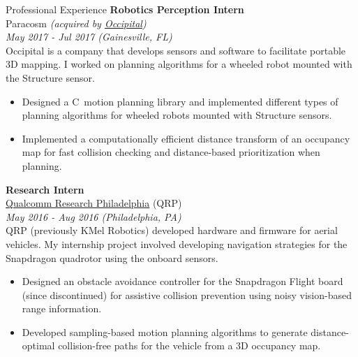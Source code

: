 \documentclass[9pt]{article}
\newcommand \CPP {{C\nolinebreak[4]\hspace{-.05em}\raisebox{.4ex}{\tiny\bf ++}}}
\begin{document}
\begin{rsection}{Professional Experience}
    \textbf{Robotics Perception Intern} \\
    Paracosm \textit{(acquired by \href{https://occipital.com/}{Occipital})}\\
    \textit{May 2017 - Jul 2017 (Gainesville, FL)} 
    \vspace{0.5em} \\
    Occipital is a company that develops sensors and software to facilitate portable 3D mapping. I worked on planning algorithms for a wheeled robot mounted with the Structure sensor.
    \begin{itemize}
        \item Designed a \CPP \ motion planning library and implemented different types of planning algorithms for wheeled robots mounted with Structure sensors.
        \item Implemented a computationally efficient distance transform of an occupancy map for fast collision checking and distance-based prioritization when planning.
    \end{itemize}
    
    \textbf{Research Intern} \\
    \href{https://www.qualcomm.com/research}{Qualcomm Research Philadelphia} (QRP) \\
    \textit{May 2016 - Aug 2016 (Philadelphia, PA)} 
    \vspace{0.5em} \\
    QRP (previously KMel Robotics) developed hardware and firmware for aerial vehicles. My internship project involved developing navigation strategies for the Snapdragon quadrotor using the onboard sensors.
    \begin{itemize}
        \item Designed an obstacle avoidance controller for the Snapdragon Flight board (since discontinued) for assistive collision prevention using noisy vision-based range information.
        \item Developed sampling-based motion planning algorithms to generate distance-optimal collision-free paths for the vehicle from a 3D occupancy map.
    \end{itemize}
\end{rsection}
\end{document}
